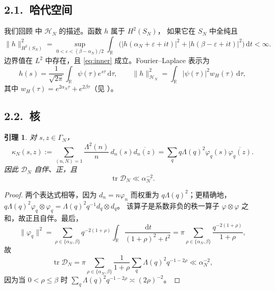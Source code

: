 \documentclass[12pt,a4paper]{amsart}
\numberwithin{equation}{section}
\theoremstyle{plain}
\newtheorem{lemma}[theorem]{引理}
\theoremstyle{definition}
\newcommand{\dd}{\,\mathrm{d}}
\newcommand{\eps}{\varepsilon}
\begin{document}
\subsection*{2.1.\ 哈代空间}

我们回顾 \cite[\S5]{LL} 中 $\mathcal H_N$ 的描述。函数 $h$ 属于 $H^2(S_N)$，
如果它在 $S_N$ 中全纯且
\[
 \|h\|^2_{H^2(S_N)}
 =\sup_{0<\eps<(\beta-\alpha_N)/2}
 \int_{\mathbb R}\bigl(|h(\alpha_N+\eps+it)|^2+|h(\beta-\eps+it)|^2\bigr)\dd t<\infty .
\]
边界值在 $L^2$ 中存在，且 \eqref{eq:inner} 成立。Fourier--Laplace 表示为
\begin{equation}\label{eq:PW}
 h(s)=\frac1{\sqrt{2\pi}}\int_{\mathbb R}\psi(\tau)e^{s\tau}\dd\tau,
 \qquad
 \|h\|^2_{\mathcal H_N}=\int_{\mathbb R}|\psi(\tau)|^2w_H(\tau)\dd\tau,
\end{equation}
其中 $w_H(\tau)=e^{2\alpha_N\tau}+e^{2\beta\tau}$（见 \cite[引理 5.2]{LL}）。

\subsection*{2.2.\ 核}

\begin{lemma}\label{lem:kernel}
对 $s,z\in\Gamma_N$，
\begin{equation}\label{eq:kernel}
 \kappa_N(s,z):=\sum_{(n,N)=1}\frac{\Lambda^2(n)}{n}\,d_n(s)\overline{d_n(z)}
 =\sum_q q\Lambda(q)^2\varphi_q(s)\overline{\varphi_q(z)} .
\end{equation}
因此 $\mathcal D_N$ 自伴、正，且
\begin{equation}\label{eq:trace}
 \operatorname{tr}\mathcal D_N\ll\alpha_N^{-2}.
\end{equation}
\end{lemma}

\begin{proof}
两个表达式相等，因为 $d_n=n\varphi_n$ 而权重为 $q\Lambda(q)^2$；更精确地，
$q\Lambda(q)^2\varphi_q\otimes\varphi_q=\Lambda(q)^2q^{-1}d_q\otimes d_q$。
该算子是系数非负的秩一算子 $\varphi\otimes\varphi$ 之和，故正且自伴。最后，
\[
 \|\varphi_q\|^2=\sum_{\rho\in\{\alpha_N,\beta\}}q^{-2(1+\rho)}
 \int_{\mathbb R}\frac{\dd t}{(1+\rho)^2+t^2}
 =\pi\sum_{\rho\in\{\alpha_N,\beta\}}\frac{q^{-2(1+\rho)}}{1+\rho},
\]
故
\[
 \operatorname{tr}\mathcal D_N
 =\pi\sum_{\rho\in\{\alpha_N,\beta\}}\frac1{1+\rho}
 \sum_q\Lambda(q)^2q^{-1-2\rho}\ll\alpha_N^{-2},
\]
因为当 $0<\rho\le\beta$ 时 $\sum_q\Lambda(q)^2q^{-1-2\rho}\asymp(2\rho)^{-2}$。
\end{proof}
\end{document}
